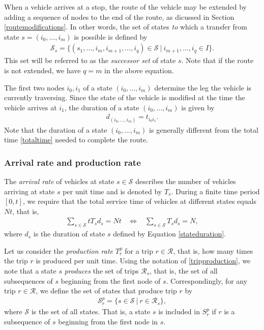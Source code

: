 \documentclass[dissertation,draft*]{aaltoseries}
\begin{document}
When a vehicle arrives at a stop, the route of the vehicle may be extended by adding a sequence of nodes to the
end of the route, as dicussed in Section \ref{routemodifications}. In other words, the set of states \emph{to} 
which a transfer from state $s = (i_0,\ldots,i_m)$ is possible is defined by
\begin{align}
\label{successors}
\mathcal{S}_{s} = \{ (s_1,\ldots ,i_m,i_{m+1},\ldots,i_q) \in \mathcal{S} \ | \ i_{m+1},\ldots,i_q \in I \}.
\end{align}
This set will be referred to as the \emph{successor set} of state $s$.
Note that if the route is not extended, we have $q=m$ in the above equation.

The first two nodes $i_0,i_1$ of a state $(i_0,\ldots,i_m)$ determine the leg the vehicle is currently traversing.
Since the state of the vehicle is modified at the time the vehicle arrives at $i_1$, 
the duration of a state $(i_0,\ldots,i_m)$ is given by 
\begin{align}
\label{stateduration}
d_{(i_0,\ldots, i_m)} = t_{i_0i_1}. 
\end{align}
Note that the duration of a state $(i_0,\ldots, i_m)$ is generally different from the total
time \eqref{totaltime} needed to complete the route.

\subsubsection{Arrival rate and production rate}
The \emph{arrival rate} of vehicles at state $s \in \mathcal{S}$ describes the 
number of vehicles arriving at state $s$ per unit time and is denoted by $T_s$.
During a finite time period $[0,t]$, we require that the total service time of vehicles 
at different states equals $Nt$, that is,
\begin{align}
\label{rajoitus01}
\sum_{s \in \mathcal{S}} t T_s d_s = Nt \ \ \ \ 
\Leftrightarrow \ \ \ \ \sum_{s \in \mathcal{S}} T_s d_s = N,
\end{align}
where $d_s$ is the duration of state $s$ defined by Equation \eqref{stateduration}.

Let us consider the \emph{production rate} $T_{r}^p$ for a trip $r \in \mathcal{R}$,
that is, how many times the trip $r$ is produced per unit time.
Using the notation of \eqref{tripproduction}, we note that a state $s$ \emph{produces}
the set of trips $\mathcal{R}_s$, that is, the set of all subsequences of $s$
beginning from the first node of $s$.
Correspondingly, for any trip $r \in \mathcal{R}$, %
we define the set of states that produce trip $r$ by 
\begin{align*}
\mathcal{S}_{r}^p = \{ s \in \mathcal{S} \ | \ r \in \mathcal{R}_s \}, 
\end{align*}
where $\mathcal{S}$ is the set of all states. That is, a state $s$ is included in $S_r^p$
if $r$ is a subsequence of $s$ beginning from the first node in $s$.
\end{document}
